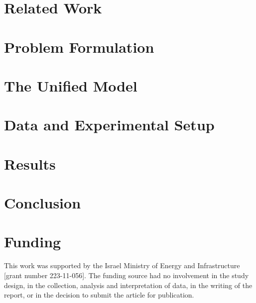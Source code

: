 \documentclass[12pt,a4paper]{article}
\begin{document}
\section{Related Work}\label{sec:related}


\section{Problem Formulation}\label{sec:modeling}


\section{The Unified Model}\label{sec:architecture}

\clearpage  %

\section{Data and Experimental Setup}\label{sec:dataset}


\section{Results}\label{sec:evaluation}


\section{Conclusion}\label{sec:conclusion}


\section*{Funding}
This work was supported by the Israel Ministry of Energy and Infrastructure
[grant number 223-11-056].  The funding source had no involvement in the
study design, in the collection, analysis and interpretation of data, in the
writing of the report, or in the decision to submit the article for
publication.



\FloatBarrier
\printbibliography
\end{document}

